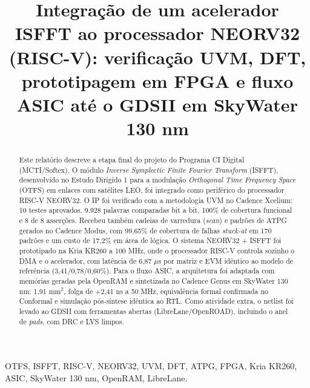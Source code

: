 \documentclass[conference]{IEEEtran}
\begin{document}
\title{Integração de um acelerador ISFFT ao processador NEORV32 (RISC-V): verificação UVM, DFT, prototipagem em FPGA e fluxo ASIC até o GDSII em SkyWater 130 nm}

\author{
}

\maketitle

\begin{abstract}
Este relatório descreve a etapa final do projeto do Programa CI Digital (MCTI/Softex). O módulo \textit{Inverse Symplectic Finite Fourier Transform} (ISFFT), desenvolvido no Estudo Dirigido 1 para a modulação \textit{Orthogonal Time Frequency Space} (OTFS) em enlaces com satélites LEO, foi integrado como periférico do processador RISC-V NEORV32. O IP foi verificado com a metodologia UVM no Cadence Xcelium: 10 testes aprovados, 9.928 palavras comparadas bit a bit, 100\% de cobertura funcional e 8 de 8 asserções. Recebeu também cadeias de varredura (\textit{scan}) e padrões de ATPG gerados no Cadence Modus, com 99,65\% de cobertura de falhas \textit{stuck-at} em 170 padrões e um custo de 17,2\% em área de lógica. O sistema NEORV32 + ISFFT foi prototipado na Kria KR260 a 100 MHz, onde o processador RISC-V controla sozinho o DMA e o acelerador, com latência de 6,87 $\mu$s por matriz e EVM idêntico ao modelo de referência (3,41/0,78/0,60\%). Para o fluxo ASIC, a arquitetura foi adaptada com memórias geradas pela OpenRAM e sintetizada no Cadence Genus em SkyWater 130 nm: 1,91 mm$^2$, folga de +2,41 ns a 50 MHz, equivalência formal confirmada no Conformal e simulação pós-síntese idêntica ao RTL. Como atividade extra, o netlist foi levado ao GDSII com ferramentas abertas (LibreLane/OpenROAD), incluindo o anel de \textit{pads}, com DRC e LVS limpos.
\end{abstract}

\begin{IEEEkeywords}
OTFS, ISFFT, RISC-V, NEORV32, UVM, DFT, ATPG, FPGA, Kria KR260, ASIC, SkyWater 130 nm, OpenRAM, LibreLane.
\end{IEEEkeywords}

\end{document}
